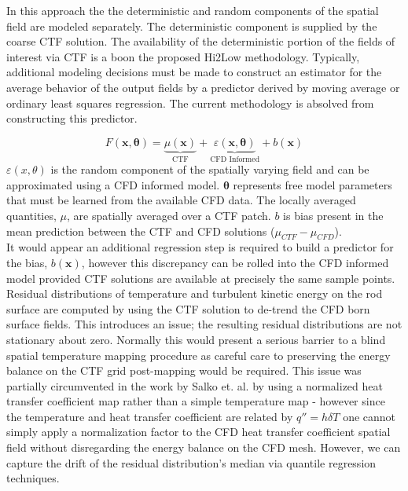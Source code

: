 In this approach the the deterministic and random components of the spatial field are modeled separately.  The deterministic component is supplied by the coarse CTF solution.
The availability of the deterministic portion of the fields of interest via CTF is a boon the proposed Hi2Low methodology.  Typically, additional modeling decisions must be made to construct an estimator for the average behavior of the output fields by a predictor derived by moving average or ordinary least squares regression.  The current methodology is absolved from constructing this predictor.

\begin{equation}
    F(\mathbf x, \mathbf \theta) = \underbrace{\mu(\mathbf{x})}_\text{CTF} + \underbrace{\varepsilon({\mathbf x, \mathbf \theta})}_\text{CFD Informed} + b(\mathbf{x})
\end{equation}
$\varepsilon(x, \theta)$ is the random component of the spatially varying field and can be approximated using a CFD informed model.  $\mathbf \theta$ represents free model parameters that must be learned from the available CFD data.
 The locally averaged quantities, $\mu$, are spatially averaged over a CTF patch.
$b$ is bias present in the mean prediction between the CTF and CFD solutions ($\mu_{CTF} - \mu_{CFD}$). \\

It would appear an additional regression step is required to build a predictor for the bias, $b(\mathbf{x})$, however this discrepancy can be rolled into the
CFD informed model provided CTF solutions are available at precisely the same sample points.
Residual distributions of temperature and turbulent kinetic energy on the rod surface are computed by using the CTF solution to de-trend the CFD born surface fields.  This introduces an issue; the resulting residual distributions are not stationary about zero.  Normally this would present
a serious barrier to a blind spatial temperature mapping procedure as careful care to preserving the energy balance on the CTF grid post-mapping would be required.  This issue was partially circumvented in the work by Salko et. al. by using a normalized heat transfer coefficient map rather than a simple temperature map - however since the temperature and heat transfer coefficient are related by $q''=h \delta T$ one cannot simply apply a normalization factor to the CFD heat transfer coefficient spatial field without disregarding the energy balance on the CFD mesh.  However, we can capture the drift of the residual distribution's median via quantile regression techniques.

